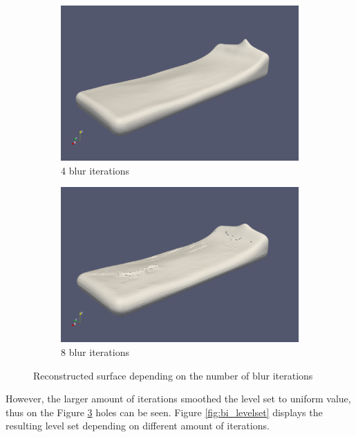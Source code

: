 \begin{figure}[H]
\begin{subfigure}[b]{0.5\textwidth}
				\label{fig:bi_1iteration}
        \end{subfigure}
        \begin{subfigure}[b]{0.5\textwidth}
               \includegraphics[width=\textwidth]{figures/ReconstructionIterations4.png}
				\caption{4 blur iterations}
               \label{fig:bi_4iteration}
        \end{subfigure}
        \begin{subfigure}[b]{0.5\textwidth}
               \includegraphics[width=\textwidth]{figures/ReconstructionIterations8.png}
				\caption{8 blur iterations}
               \label{fig:bi_8iteration}
        \end{subfigure}
       \caption{Reconstructed surface depending on the number of blur iterations}
       \label{fig:bi_reconstruction}
\end{figure}
However, the larger amount of iterations smoothed the level set to uniform value, thus on the Figure \ref{fig:bi_8iteration} holes can be seen. Figure \ref{fig:bi_levelset} displays the resulting level set depending on different amount of iterations. 
